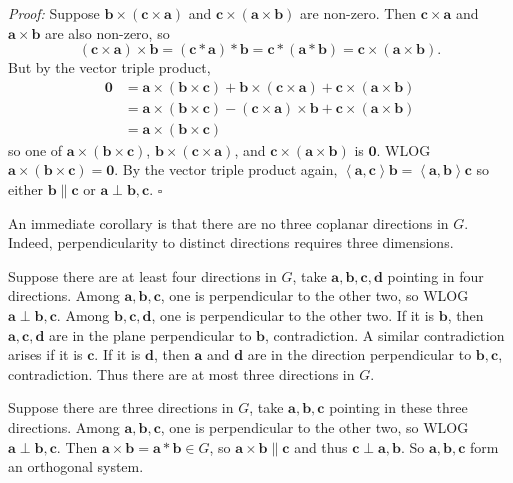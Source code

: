 \emph{Proof:} Suppose $\mathbf{b}\times(\mathbf{c}\times\mathbf{a})$ and $\mathbf{c}\times(\mathbf{a}\times\mathbf{b})$ are non-zero. Then $\mathbf{c}\times\mathbf{a}$ and $\mathbf{a}\times\mathbf{b}$ are also non-zero, so
\[
	(\mathbf{c}\times\mathbf{a})\times\mathbf{b}=(\mathbf{c}*\mathbf{a})*\mathbf{b}=\mathbf{c}*(\mathbf{a}*\mathbf{b})=\mathbf{c}\times(\mathbf{a}\times\mathbf{b}).
\]
But by the vector triple product,
\begin{align*}
	\mathbf{0} &= \mathbf{a}\times(\mathbf{b}\times\mathbf{c})+\mathbf{b}\times(\mathbf{c}\times\mathbf{a})+\mathbf{c}\times(\mathbf{a}\times\mathbf{b}) \\
	&= \mathbf{a}\times(\mathbf{b}\times\mathbf{c})-(\mathbf{c}\times\mathbf{a})\times\mathbf{b}+\mathbf{c}\times(\mathbf{a}\times\mathbf{b}) \\
	&= \mathbf{a}\times(\mathbf{b}\times\mathbf{c})
\end{align*}
so one of $\mathbf{a}\times(\mathbf{b}\times\mathbf{c})$, $\mathbf{b}\times(\mathbf{c}\times\mathbf{a})$, and $\mathbf{c}\times(\mathbf{a}\times\mathbf{b})$ is $\mathbf{0}$. WLOG $\mathbf{a}\times(\mathbf{b}\times\mathbf{c})=\mathbf{0}$. By the vector triple product again, $\left\langle\mathbf{a},\mathbf{c}\right\rangle\mathbf{b}=\left\langle\mathbf{a},\mathbf{b}\right\rangle\mathbf{c}$ so either $\mathbf{b}\parallel\mathbf{c}$ or $\mathbf{a}\perp\mathbf{b},\mathbf{c}$. \hfill$\square$

An immediate corollary is that there are no three coplanar directions in $G$. Indeed, perpendicularity to distinct directions requires three dimensions.

Suppose there are at least four directions in $G$, take $\mathbf{a},\mathbf{b},\mathbf{c},\mathbf{d}$ pointing in four directions. Among $\mathbf{a},\mathbf{b},\mathbf{c}$, one is perpendicular to the other two, so WLOG $\mathbf{a}\perp\mathbf{b},\mathbf{c}$. Among $\mathbf{b},\mathbf{c},\mathbf{d}$, one is perpendicular to the other two. If it is $\mathbf{b}$, then $\mathbf{a},\mathbf{c},\mathbf{d}$ are in the plane perpendicular to $\mathbf{b}$, contradiction. A similar contradiction arises if it is $\mathbf{c}$. If it is $\mathbf{d}$, then $\mathbf{a}$ and $\mathbf{d}$ are in the direction perpendicular to $\mathbf{b},\mathbf{c}$, contradiction. Thus there are at most three directions in $G$.

Suppose there are three directions in $G$, take $\mathbf{a},\mathbf{b},\mathbf{c}$ pointing in these three directions. Among $\mathbf{a},\mathbf{b},\mathbf{c}$, one is perpendicular to the other two, so WLOG $\mathbf{a}\perp\mathbf{b},\mathbf{c}$. Then $\mathbf{a}\times\mathbf{b}=\mathbf{a}*\mathbf{b}\in G$, so $\mathbf{a}\times\mathbf{b}\parallel\mathbf{c}$ and thus $\mathbf{c}\perp\mathbf{a},\mathbf{b}$. So $\mathbf{a},\mathbf{b},\mathbf{c}$ form an orthogonal system.

